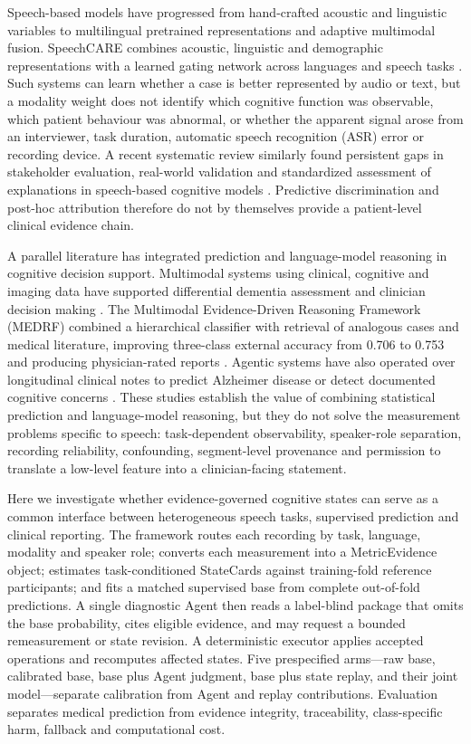 \documentclass[pdflatex,sn-nature]{sn-jnl}
\begin{document}
Speech-based models have progressed from hand-crafted acoustic and linguistic variables to multilingual pretrained representations and adaptive multimodal fusion. SpeechCARE combines acoustic, linguistic and demographic representations with a learned gating network across languages and speech tasks \cite{Azadmaleki2025}. Such systems can learn whether a case is better represented by audio or text, but a modality weight does not identify which cognitive function was observable, which patient behaviour was abnormal, or whether the apparent signal arose from an interviewer, task duration, automatic speech recognition (ASR) error or recording device. A recent systematic review similarly found persistent gaps in stakeholder evaluation, real-world validation and standardized assessment of explanations in speech-based cognitive models \cite{Shankar2025}. Predictive discrimination and post-hoc attribution therefore do not by themselves provide a patient-level clinical evidence chain.

A parallel literature has integrated prediction and language-model reasoning in cognitive decision support. Multimodal systems using clinical, cognitive and imaging data have supported differential dementia assessment and clinician decision making \cite{Qiu2022,Xue2024}. The Multimodal Evidence-Driven Reasoning Framework (MEDRF) combined a hierarchical classifier with retrieval of analogous cases and medical literature, improving three-class external accuracy from 0.706 to 0.753 and producing physician-rated reports \cite{Hu2026}. Agentic systems have also operated over longitudinal clinical notes to predict Alzheimer disease or detect documented cognitive concerns \cite{Li2025,Tian2026}. These studies establish the value of combining statistical prediction and language-model reasoning, but they do not solve the measurement problems specific to speech: task-dependent observability, speaker-role separation, recording reliability, confounding, segment-level provenance and permission to translate a low-level feature into a clinician-facing statement.

Here we investigate whether evidence-governed cognitive states can serve as a common interface between heterogeneous speech tasks, supervised prediction and clinical reporting. The framework routes each recording by task, language, modality and speaker role; converts each measurement into a MetricEvidence object; estimates task-conditioned StateCards against training-fold reference participants; and fits a matched supervised base from complete out-of-fold predictions. A single diagnostic Agent then reads a label-blind package that omits the base probability, cites eligible evidence, and may request a bounded remeasurement or state revision. A deterministic executor applies accepted operations and recomputes affected states. Five prespecified arms---raw base, calibrated base, base plus Agent judgment, base plus state replay, and their joint model---separate calibration from Agent and replay contributions. Evaluation separates medical prediction from evidence integrity, traceability, class-specific harm, fallback and computational cost.
\end{document}
